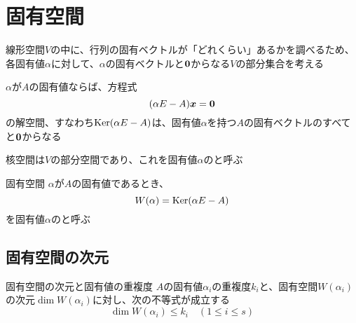 \documentclass[../../../topic_linear-algebra]{subfiles}
\begin{document}
\sectionline
\section{固有空間}

線形空間$V$の中に、行列の固有ベクトルが「どれくらい」あるかを調べるため、各固有値$\alpha$に対して、$\alpha$の固有ベクトルと$\vb*{0}$からなる$V$の部分集合を考える

\br

$\alpha$が$A$の固有値ならば、方程式
\begin{equation*}
  (\alpha E - A)\vb*{x} = \vb*{0}
\end{equation*}
の解空間、すなわち$\operatorname{Ker}(\alpha E - A)$は、固有値$\alpha$を持つ$A$の固有ベクトルのすべてと$\vb*{0}$からなる

\br

核空間は$V$の部分空間であり、これを固有値$\alpha$のと呼ぶ

\begin{definition}{固有空間}
  $\alpha$が$A$の固有値であるとき、
  \begin{equation*}
    W(\alpha) = \operatorname{Ker}(\alpha E - A)
  \end{equation*}
  を固有値$\alpha$のと呼ぶ
\end{definition}

\subsection{固有空間の次元}

\begin{theorem}{固有空間の次元と固有値の重複度}\label{thm:geom-mult-leq-alg-mult}
  $A$の固有値$\alpha_i$の重複度$k_i$と、固有空間$W(\alpha_i)$の次元$\dim W(\alpha_i)$に対し、次の不等式が成立する
  \begin{equation*}
    \dim W(\alpha_i) \leq k_i \quad (1 \leq i \leq s)
  \end{equation*}
\end{theorem}
\end{document}

